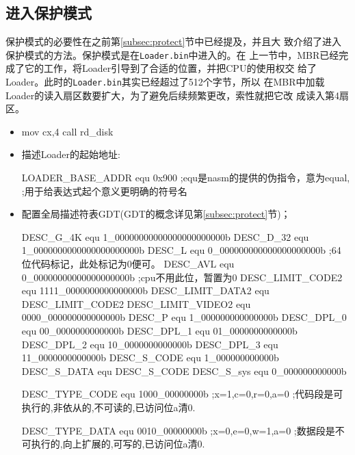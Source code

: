 \subsection{进入保护模式}
\label{sec:inprotect}

保护模式的必要性在之前第\ref{subsec:protect}节中已经提及，并且大
致介绍了进入保护模式的方法。保护模式是在\texttt{Loader.bin}中进入的。在
上一节中，MBR已经完成了它的工作，将Loader引导到了合适的位置，并把CPU的使用权交
给了Loader。此时的\texttt{Loader.bin}其实已经超过了512个字节，所以
在MBR中加载Loader的读入扇区数要扩大，为了避免后续频繁更改，索性就把它改
成读入第4扇区。\par\bigskip

\begin{itemize}
\item[] 
  \begin{nasmcode}
    mov cx,4
    call rd_disk
  \end{nasmcode}

\item 描述Loader的起始地址:
\begin{nasmcode}
  LOADER_BASE_ADDR equ 0x900   ;equ是nasm的提供的伪指令，意为equal,
                               ;用于给表达式起个意义更明确的符号名
\end{nasmcode}

\item 配置全局描述符表GDT(GDT的概念详见第\ref{subsec:protect}节)；
\begin{nasmcode}
DESC_G_4K   equ   1_00000000000000000000000b   
DESC_D_32   equ    1_0000000000000000000000b
DESC_L      equ     0_000000000000000000000b    ;64位代码标记，此处标记为0便可。
DESC_AVL    equ      0_00000000000000000000b    ;cpu不用此位，暂置为0  
DESC_LIMIT_CODE2  equ 1111_0000000000000000b
DESC_LIMIT_DATA2  equ DESC_LIMIT_CODE2
DESC_LIMIT_VIDEO2 equ  0000_000000000000000b
DESC_P            equ     1_000000000000000b
DESC_DPL_0        equ      00_0000000000000b
DESC_DPL_1        equ      01_0000000000000b
DESC_DPL_2        equ      10_0000000000000b
DESC_DPL_3        equ      11_0000000000000b
DESC_S_CODE       equ        1_000000000000b
DESC_S_DATA       equ DESC_S_CODE
DESC_S_sys        equ        0_000000000000b

DESC_TYPE_CODE    equ  1000_00000000b   ;x=1,c=0,r=0,a=0
                                        ;代码段是可执行的,非依从的,不可读的,已访问位a清0.  
                               
DESC_TYPE_DATA    equ  0010_00000000b   ;x=0,e=0,w=1,a=0
                                        ;数据段是不可执行的,向上扩展的,可写的,已访问位a清0.


\end{nasmcode}
\end{itemize}
